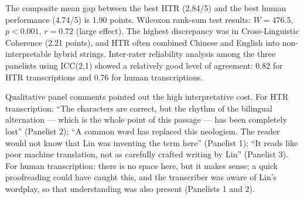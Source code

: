 \documentclass[final]{anthology-ch} %
\begin{document}
\begin{table}[h]
  \centering
  \small
  \caption{Interpretive Fitness Audit: mean scores (1--5 scale). Standard deviations in parentheses; Wilcoxon signed-rank test.}
  \label{tab:fitness}
\end{table}

The composite mean gap between the best HTR (2.84/5) and the best human performance (4.74/5) is 1.90 points. Wilcoxon rank-sum test results: $W = 476.5$, $p < 0.001$, $r = 0.72$ (large effect). The highest discrepancy was in Cross-Linguistic Coherence (2.21 points), and HTR often combined Chinese and English into non-interpretable hybrid strings. Inter-rater reliability analysis among the three panelists using ICC(2,1) showed a relatively good level of agreement: 0.82 for HTR transcriptions and 0.76 for human transcriptions.

Qualitative panel comments pointed out the high interpretative cost. For HTR transcription: \enquote{The characters are correct, but the rhythm of the bilingual alternation --- which is the whole point of this passage --- has been completely lost} (Panelist 2); \enquote{A common word has replaced this neologism. The reader would not know that Lin was inventing the term here} (Panelist 1); \enquote{It reads like poor machine translation, not as carefully crafted writing by Lin} (Panelist 3). For human transcription: there is no space here, but it makes sense; a quick proofreading could have caught this, and the transcriber was aware of Lin's wordplay, so that understanding was also present (Panelists 1 and 2).
\end{document}

